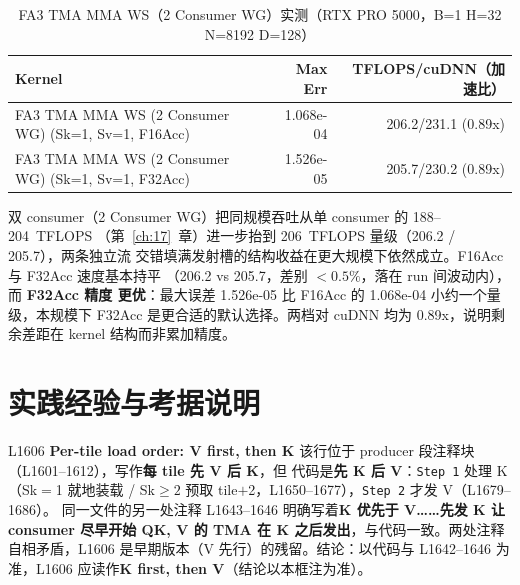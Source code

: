 \begin{table}[H]
\centering
\caption{FA3 TMA MMA WS（2 Consumer WG）实测（RTX PRO 5000，B=1 H=32 N=8192 D=128）}
\label{tab:ch18-perf}
\footnotesize
\setlength{\tabcolsep}{4pt}
\begin{tabular}{lrr}
\toprule
Kernel & Max Err & TFLOPS/cuDNN（加速比） \\
\midrule
FA3 TMA MMA WS (2 Consumer WG) (Sk=1, Sv=1, F16Acc) & 1.068e-04 & 206.2/231.1 (0.89x) \\
FA3 TMA MMA WS (2 Consumer WG) (Sk=1, Sv=1, F32Acc) & 1.526e-05 & 205.7/230.2 (0.89x) \\
\bottomrule
\end{tabular}
\end{table}

双 consumer（2 Consumer WG）把同规模吞吐从单 consumer 的 188--204~TFLOPS
（第~\ref{ch:17}~章）进一步抬到 206~TFLOPS 量级（206.2 / 205.7），两条独立流
交错填满发射槽的结构收益在更大规模下依然成立。F16Acc 与 F32Acc 速度基本持平
（206.2 vs 205.7，差别 $<0.5\%$，落在 run 间波动内），而 \textbf{F32Acc 精度
更优}：最大误差 1.526e-05 比 F16Acc 的 1.068e-04 小约一个量级，本规模下
F32Acc 是更合适的默认选择。两档对 cuDNN 均为 0.89x，说明剩余差距在 kernel
结构而非累加精度。

\section{实践经验与考据说明}

\begin{kaogu}[F1·注释与代码相反]{L1606 \textbf{Per-tile load order: V first, then K}}
  该行位于 producer 段注释块（L1601--1612），写作\textbf{每 tile 先 V 后 K}，但
  代码是\textbf{先 K 后 V}：\texttt{Step 1} 处理 K（Sk$=$1 就地装载 /
  Sk$\ge2$ 预取 tile$+$2，L1650--1677），\texttt{Step 2} 才发 V（L1679--1686）。
  同一文件的另一处注释 L1643--1646 明确写着\textbf{K 优先于 V……先发 K
  让 consumer 尽早开始 QK, V 的 TMA 在 K 之后发出}，与代码一致。两处注释
  自相矛盾，L1606 是早期版本（V 先行）的残留。结论：以代码与 L1642--1646
  为准，L1606 应读作\textbf{K first, then V}（结论以本框注为准）。
\end{kaogu}

